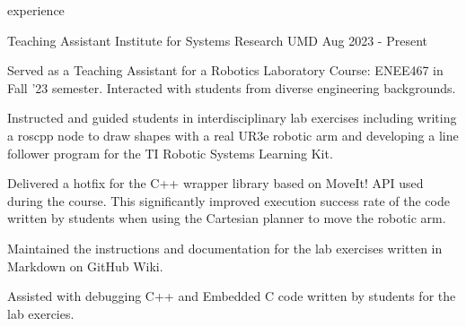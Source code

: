 \begin{section}{experience}

  \begin{work}
    {Teaching Assistant}
    {Institute for Systems Research}
    {UMD}
    {Aug 2023 - Present}

    \item Served as a Teaching Assistant for a Robotics Laboratory Course:
          ENEE467 in Fall '23 semester. Interacted with students from
          diverse engineering backgrounds.

    \item Instructed and guided students in interdisciplinary lab exercises
          including writing a roscpp node to draw shapes with a real UR3e
          robotic arm and developing a line follower program for the TI Robotic
          Systems Learning Kit.

    \item Delivered a hotfix for the C++ wrapper library based on MoveIt!
          API used during the course. This significantly improved execution
          success rate of the code written by students when using the Cartesian
          planner to move the robotic arm.

    \item Maintained the instructions and documentation for the lab exercises
          written in Markdown on GitHub Wiki.

    \item Assisted with debugging C++ and Embedded C code written by students
          for the lab exercies.


  
  \end{work}




\end{section}
